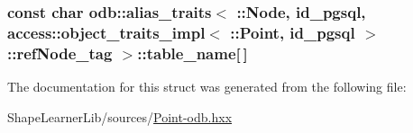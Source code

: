 \subsubsection[{table\+\_\+name}]{\setlength{\rightskip}{0pt plus 5cm}const char odb\+::alias\+\_\+traits$<$ \+::{\bf Node}, id\+\_\+pgsql, access\+::object\+\_\+traits\+\_\+impl$<$ \+::{\bf Point}, id\+\_\+pgsql $>$\+::ref\+Node\+\_\+tag $>$\+::table\+\_\+name\mbox{[}$\,$\mbox{]}\hspace{0.3cm}{\ttfamily [static]}}\label{structodb_1_1alias__traits_3_01_1_1_node_00_01id__pgsql_00_01access_1_1object__traits__impl_3_013274b82f95462fed7f5ef459567458b6_a6b4bc63fd277f8a6be635ac272030a8b}


The documentation for this struct was generated from the following file\+:\begin{DoxyCompactItemize}
\item 
Shape\+Learner\+Lib/sources/\hyperlink{_point-odb_8hxx}{Point-\/odb.\+hxx}\end{DoxyCompactItemize}
